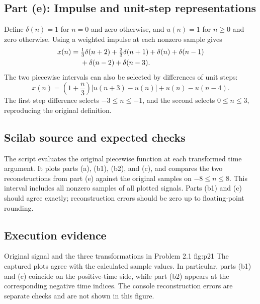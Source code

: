 \subsection{Part (e): Impulse and unit-step representations}
Define $\delta(n)=1$ for $n=0$ and zero otherwise, and $u(n)=1$ for
$n\geq0$ and zero otherwise. Using a weighted impulse at each nonzero
sample gives
\begin{align}
  x(n)={}&\tfrac13\delta(n+2)+\tfrac23\delta(n+1)
          +\delta(n)+\delta(n-1)\notag\\
       &+\delta(n-2)+\delta(n-3).
\end{align}
The two piecewise intervals can also be selected by differences of
unit steps:
\begin{equation}
  x(n)=\left(1+\frac n3\right)\bigl[u(n+3)-u(n)\bigr]
       +u(n)-u(n-4).
\end{equation}
The first step difference selects $-3\leq n\leq-1$, and the second
selects $0\leq n\leq3$, reproducing the original definition.

\subsection{Scilab source and expected checks}
The script evaluates the original piecewise function at each transformed
time argument. It plots parts (a), (b1), (b2), and (c), and compares the
two reconstructions from part (e) against the original samples on
$-8\leq n\leq8$. This interval includes all nonzero samples of all
plotted signals. Parts (b1) and (c) should agree exactly; reconstruction
errors should be zero up to floating-point rounding.


\subsection{Execution evidence}
  {Original signal and the three transformations in Problem 2.1}
  {fig:p21}
The captured plots agree with the calculated sample values. In particular,
parts (b1) and (c) coincide on the positive-time side, while part (b2)
appears at the corresponding negative time indices. The console
reconstruction errors are separate checks and are not shown in this figure.
